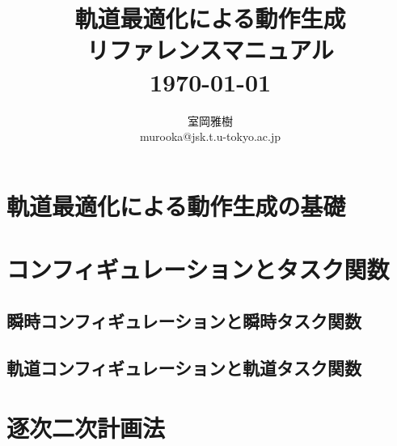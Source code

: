 \documentclass[]{jarticle}
\begin{document}
\newenvironment{refdesc}{
 \vspace{5mm} \parindent=0mm \topsep=0mm \parskip=0mm \leftmargin=10mm}{
             \parindent=10mm \topsep=3mm \parskip=1mm \leftmargin=0mm }


\date{}
\title{{\LARGE \bf 軌道最適化による動作生成 \\ リファレンスマニュアル} \\
\vspace{10mm}
{\large \today} \\
}

\author{
室岡雅樹 \\
murooka@jsk.t.u-tokyo.ac.jp \\
}

\thispagestyle{empty}
\maketitle
{}
\tableofcontents

\newpage
{}

\section{軌道最適化による動作生成の基礎}


\section{コンフィギュレーションとタスク関数} \label{chap:config-task}
\subsection{瞬時コンフィギュレーションと瞬時タスク関数} \label{sec:instant-config-task}

\subsection{軌道コンフィギュレーションと軌道タスク関数} \label{sec:trajectory-config-task}


\section{逐次二次計画法} \label{chap:sqp}


\end{document}
